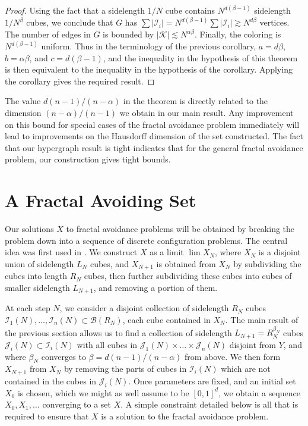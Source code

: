 \documentclass{article}
\theoremstyle{plain}
\theoremstyle{plain}
\begin{document}
\begin{multicols}{2}
\begin{proof}
	Using the fact that a sidelength $1/N$ cube contains $N^{d(\beta - 1)}$ sidelength $1/N^\beta$ cubes, we conclude that $G$ has $\sum |\mathcal{I}_i| = N^{d(\beta - 1)} \sum |\mathcal{I}_i| \gtrsim N^{d \beta}$ vertices. The number of edges in $G$ is bounded by $|\mathcal{K}| \lesssim N^{\alpha \beta}$. Finally, the coloring is $N^{d(\beta - 1)}$ uniform. Thus in the terminology of the previous corollary, $a = d \beta$, $b = \alpha \beta$, and $c = d(\beta - 1)$, and the inequality in the hypothesis of this theorem is then equivalent to the inequality in the hypothesis of the corollary. Applying the corollary gives the required result.
\end{proof}

The value $d(n-1)/(n-\alpha)$ in the theorem is directly related to the dimension $(n-\alpha)/(n-1)$ we obtain in our main result. Any improvement on this bound for special cases of the fractal avoidance problem immediately will lead to improvements on the Hausdorff dimension of the set constructed. The fact that our hypergraph result is tight indicates that for the general fractal avoidance problem, our construction gives tight bounds.


\section{A Fractal Avoiding Set}

Our solutions $X$ to fractal avoidance problems will be obtained by breaking the problem down into a sequence of discrete configuration problems. The central idea was first used in \cite{MalabikaRob}. We construct $X$ as a limit $\lim X_N$, where $X_N$ is a disjoint union of sidelength $L_N$ cubes, and $X_{N+1}$ is obtained from $X_N$ by subdividing the cubes into length $R_N$ cubes, then further subdividing these cubes into cubes of smaller sidelength $L_{N+1}$, and removing a portion of them.

At each step $N$, we consider a disjoint collection of sidelength $R_N$ cubes $\mathcal{I}_1(N), \dots, \mathcal{I}_n(N) \subset \mathcal{B}(R_N)$, each cube contained in $X_N$. The main result of the previous section allows us to find a collection of sidelength $L_{N+1} = R_N^{\beta_N}$ cubes $\mathcal{J}_i(N) \subset \mathcal{I}_i(N)$ with all cubes in $\mathcal{J}_1(N) \times \dots \times \mathcal{J}_n(N)$ disjoint from $Y$, and where $\beta_N$ converges to $\beta = d(n-1)/(n-\alpha)$ from above. We then form $X_{N+1}$ from $X_N$ by removing the parts of cubes in $\mathcal{I}_i(N)$ which are not contained in the cubes in $\mathcal{J}_i(N)$. Once parameters are fixed, and an initial set $X_0$ is chosen, which we might as well assume to be $[0,1]^d$, we obtain a sequence $X_0, X_1, \dots$ converging to a set $X$. A simple constraint detailed below is all that is required to ensure that $X$ is a solution to the fractal avoidance problem.


\end{multicols}
\end{document}
